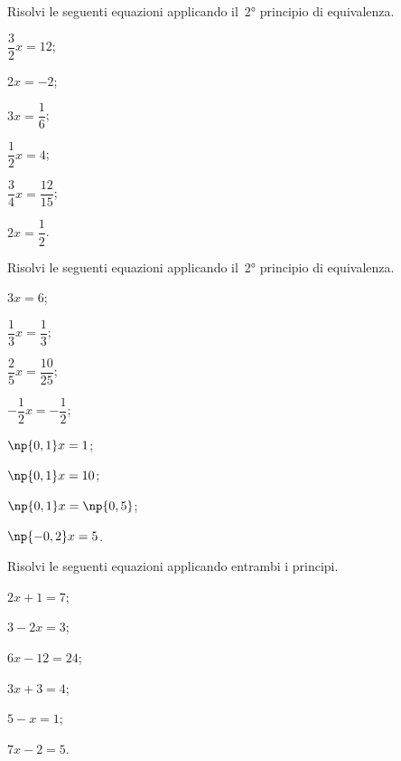 \begin{esercizio}
\label{ese:13.7}
Risolvi le seguenti equazioni applicando il~2° principio di equivalenza.
\begin{multicols}{3}
\begin{enumeratea}
\spazielenx
 \item $\dfrac{3}{2}x=12$;
 \item $2x=-2$;
 \item $3x=\dfrac{1}{6}$;
 \item $\dfrac{1}{2}x=4$;
 \item $\dfrac{3}{4}x=\dfrac{12}{15}$;
 \item $2x=\dfrac{1}{2}$.
\end{enumeratea}
\end{multicols}
\end{esercizio}

\begin{esercizio}
\label{ese:13.8}
Risolvi le seguenti equazioni applicando il~2° principio di equivalenza.
\begin{multicols}{4}
\begin{enumeratea}
\spazielenx
 \item $3x=6$;
 \item $\dfrac{1}{3}x=\dfrac{1}{3}$;
 \item $\dfrac{2}{5}x=\dfrac{10}{25}$;
 \item $-{\dfrac{1}{2}}x=-{\dfrac{1}{2}}$;
 \item $\np{0,1}x=1$;
 \item $\np{0,1}x=10$;
 \item $\np{0,1}x=\np{0,5}$;
 \item $\np{-0,2}x=5$.
\end{enumeratea}
\end{multicols}
\end{esercizio}


\begin{esercizio}
\label{ese:13.9}
Risolvi le seguenti equazioni applicando entrambi i principi.
\begin{multicols}{3}
\begin{enumeratea}
\spazielenx
 \item $2x+1=7$;
 \item $3-2x=3$;
 \item $6x-12=24$;
 \item $3x+3=4$;
 \item $5-x=1$;
 \item $7x-2=5$.
\end{enumeratea}
\end{multicols}
\end{esercizio}

